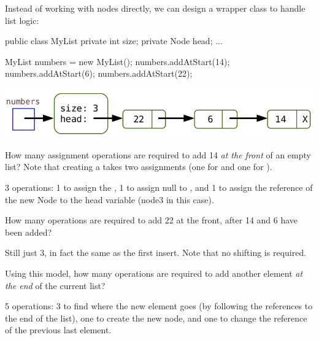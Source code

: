 Instead of working with nodes directly, we can design a wrapper class to handle list logic:

\vspace{1ex}
\begin{minipage}{0.40\linewidth}
\begin{javalst}
    public class MyList
    {
        private int size;
        private Node head;
        ...
    }
\end{javalst}
\end{minipage}
\hfill
\begin{minipage}{0.58\linewidth}
\begin{javalst}
    MyList numbers = new MyList();
    numbers.addAtStart(14);
    numbers.addAtStart(6);
    numbers.addAtStart(22);
\end{javalst}
\includegraphics[scale=0.35]{figs/list3.png}
\end{minipage}
\vspace{1ex}




\Q How many assignment operations are required to add 14 {\it at the front} of an empty list? Note that creating a  takes two assignments (one for  and one for ).

\begin{answer}
3 operations: 1 to assign the , 1 to assign null to , and 1 to assign the reference of the new Node to the head variable (node3 in this case).
\end{answer}


\Q How many operations are required to add 22 at the front, after 14 and 6 have been added?

\begin{answer}
Still just 3, in fact the same as the first insert. Note that no shifting is required.
\end{answer}


\Q Using this model, how many operations are required to add another element {\it at the end} of the current list?

\begin{answer}
5 operations: 3 to find where the new element goes (by following the references to the end of the list), one to create the new node, and one to change the reference of the previous last element.
\end{answer}


